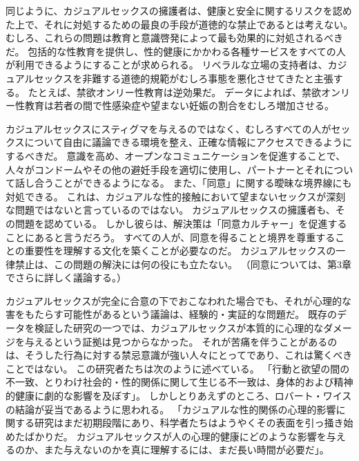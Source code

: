\documentclass[paper=a4,book,openany]{jlreq} \usepackage{mystyle}
\begin{document}
同じように、カジュアルセックスの擁護者は、健康と安全に関するリスクを認めた上で、それに対処するための最良の手段が道徳的な禁止であるとは考えない。
むしろ、これらの問題は教育と意識啓発によって最も効果的に対処されるべきだ。
包括的な性教育を提供し、性的健康にかかわる各種サービスをすべての人が利用できるようにすることが求められる。
リベラルな立場の支持者は、カジュアルセックスを非難する道徳的規範がむしろ事態を悪化させてきたと主張する。
たとえば、禁欲オンリー性教育は逆効果だ。
データによれば、禁欲オンリー性教育は若者の間で性感染症や望まない妊娠の割合をむしろ増加させる。

カジュアルセックスにスティグマを与えるのではなく、むしろすべての人がセックスについて自由に議論できる環境を整え、正確な情報にアクセスできるようにするべきだ。
意識を高め、オープンなコミュニケーションを促進することで、人々がコンドームやその他の避妊手段を適切に使用し、パートナーとそれについて話し合うことができるようになる。
また、「同意」に関する曖昧な境界線にも対処できる。
これは、カジュアルな性的接触において望まないセックスが深刻な問題ではないと言っているのではない。
カジュアルセックスの擁護者も、その問題を認めている。
しかし彼らは、解決策は「同意カルチャー」を促進することにあると言うだろう。
すべての人が、同意を得ることと境界を尊重することの重要性を理解する文化を築くことが必要なのだ。
カジュアルセックスの一律禁止は、この問題の解決には何の役にも立たない。
（同意については、第3章でさらに詳しく議論する。）

カジュアルセックスが完全に合意の下でおこなわれた場合でも、それが心理的な害をもたらす可能性があるという議論は、経験的・実証的な問題だ。
既存のデータを検証した研究の一つでは、カジュアルセックスが本質的に心理的なダメージを与えるという証拠は見つからなかった。
それが苦痛を伴うことがあるのは、そうした行為に対する禁忌意識が強い人々にとってであり、これは驚くべきことではない。
この研究者たちは次のように述べている。
「行動と欲望の間の不一致、とりわけ社会的・性的関係に関して生じる不一致は、身体的および精神的健康に劇的な影響を及ぼす」\citep{garcia12:_sexual_hookup_cultur}。
しかしとりあえずのところ、ロバート・ワイスの結論が妥当であるように思われる。
「カジュアルな性的関係の心理的影響に関する研究はまだ初期段階にあり、科学者たちはようやくその表面を引っ掻き始めたばかりだ。
カジュアルセックスが人の心理的健康にどのような影響を与えるのか、また与えないのかを真に理解するには、まだ長い時間が必要だ」\citep{weiss15:_what_are_psyc}。
\end{document}
